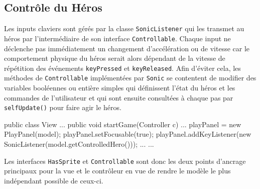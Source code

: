 \documentclass[a4paper, 12pt]{article}
\begin{document}
\subsection{Contrôle du Héros}

Les inputs claviers sont gérés par la classe {\tt SonicListener} qui les transmet au héros par l'intermédiaire de son interface {\tt Controllable}. Chaque input ne déclenche pas immédiatement un changement d'accélération ou de vitesse car le comportement physique du héros serait alors dépendant de la vitesse de répétition des événements {\tt keyPressed} et {\tt keyReleased}. Afin d'éviter cela, les méthodes de {\tt Controllable} implémentées par {\tt Sonic} se contentent de modifier des variables booléennes ou entière simples qui définissent l'état du héros et les commandes de l'utilisateur et qui sont ensuite consultées à chaque pas par {\tt selfUpdate()} pour faire agir le héros.

\clearpage

\begin{java}
public class View{
  ...
    public void startGame(Controller c){
    ...
    playPanel = new PlayPanel(model);
    playPanel.setFocusable(true);
    playPanel.addKeyListener(new SonicListener(model.getControlledHero()));
    ...
  }
  ...
}
\end{java}

\vspace{1em}
\vspace{1em}

Les interfaces {\tt HasSprite} et {\tt Controllable} sont donc les deux points d'ancrage principaux pour la vue et le contrôleur en vue de rendre le modèle le plus indépendant possible de ceux-ci.
\end{document}
